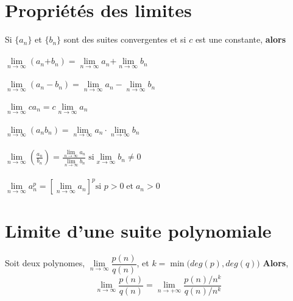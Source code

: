 \documentclass{report}
\begin{document}
\begin{multicols*}{3}
    \section{Propriétés des limites}
        Si $\{a_n\}$ et $\{b_n\}$ sont des suites convergentes et 
        si $c$ est une constante, \textbf{alors} \\\\ 
        $\lim\limits_{n\to\infty  }\left(a_n \text{+} b_n \right) = 
        \lim\limits_{n\to\infty  }a_n \text{+} 
        \lim\limits_{n\to\infty  }b_n$
        \\\\
        $\lim\limits_{n\to\infty  }\left(a_n - b_n \right) = 
        \lim\limits_{n\to\infty  }a_n - \lim\limits_{n\to\infty  }b_n$ 
        \\\\
        $\lim\limits_{n\to\infty  }ca_n = c \lim\limits_{n \to \infty  }a_n$ 
        \\\\
        $\lim\limits_{n\to\infty  }\left(a_nb_n \right) = 
        \lim\limits_{n\to\infty  }a_n \cdot \lim\limits_{n\to\infty  }b_n$
        \\\\
        $\lim\limits_{n\to\infty  }\left(\frac{a_n}{b_n} \right) = 
        \frac{\lim\limits_{n\to\infty  }a_n}{\lim\limits_{n\to\infty  }b_n}
        \;
        \text{si} \lim\limits_{x\to\infty  }b_n \neq 0$
        \\\\
        $\lim\limits_{n\to\infty  }a_n^{p} = 
        \left[\lim\limits_{n\to\infty  }a_n \right]^p \text{si } 
        p > 0 \; \text{et} \; a_n > 0$



    \section{Limite d'une suite polynomiale} 
        Soit deux polynomes,
        $\lim\limits_{n\to \infty } \dfrac{p(n)}{q(n)}$, 
        et 
        $k = \min\bigl(deg(p), deg(q)\bigr)$
        \textbf{Alors},   
        \[ \lim\limits_{n\to \infty } \dfrac{p(n)}{q(n)} =
        \lim\limits_{n\to+\infty}\dfrac{p(n)/{n^k}}{q(n)/n^{k}} \]




\end{multicols*}
\end{document}
